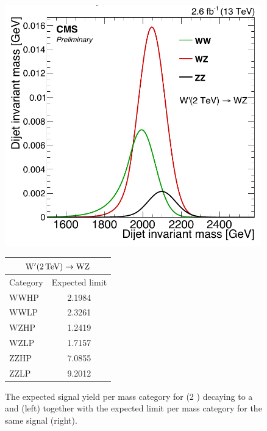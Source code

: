  \begin{figure}
 \centering
 \begin{minipage}{0.5\textwidth}
 \centering
 \includegraphics[width=0.99\textwidth]{figures/analysis/search1/misc/massCategories.pdf}
 \end{minipage}
 \begin{minipage}{0.29\textwidth}
 \centering
 \captionsetup{type=table} %
 \begin{tabular}{| l | c |}
 \hline
 \multicolumn{2}{|c|}{$\mathrm{W}^\prime (2 \,\text{Te\hspace{-.08em}V}) \rightarrow \mathrm{W}\mathrm{Z}$}\\
 \hline
 Category & Expected limit \\
 \hline
 WWHP & 2.1984 \\ 
 WWLP & 2.3261 \\ 
 WZHP & 1.2419 \\ 
 WZLP & 1.7157 \\ 
 ZZHP & 7.0855 \\ 
 ZZLP & 9.2012 \\ 
 \hline
 \end{tabular}
 \end{minipage}
 \caption{The expected signal yield per mass category for \PWpr (2 \TeV) decaying to a \PW and \PZ (left) together with the expected limit per mass category for the same signal (right).}
 \label{fig:searchI:massCatWpr}
 \end{figure}
